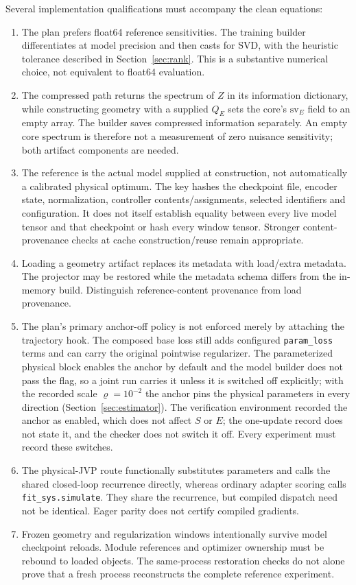 \documentclass[11pt,a4paper]{article}
\newcommand{\code}[1]{\nolinkurl{#1}}
\theoremstyle{remark}
\begin{document}
Several implementation qualifications must accompany the clean equations:
\begin{enumerate}
\item The plan prefers float64 reference sensitivities. The training builder differentiates at model precision and then casts for SVD, with the heuristic tolerance described in Section~\ref{sec:rank}. This is a substantive numerical choice, not equivalent to float64 evaluation.
\item The compressed path returns the spectrum of $Z$ in its information dictionary, while constructing geometry with a supplied $Q_E$ sets the core's $\mathrm{sv}_E$ field to an empty array. The builder saves compressed information separately. An empty core spectrum is therefore not a measurement of zero nuisance sensitivity; both artifact components are needed.
\item The reference is the actual model supplied at construction, not automatically a calibrated physical optimum. The key hashes the checkpoint file, encoder state, normalization, controller contents/assignments, selected identifiers and configuration. It does not itself establish equality between every live model tensor and that checkpoint or hash every window tensor. Stronger content-provenance checks at cache construction/reuse remain appropriate.
\item Loading a geometry artifact replaces its metadata with load/extra metadata. The projector may be restored while the metadata schema differs from the in-memory build. Distinguish reference-content provenance from load provenance.
\item The plan's primary anchor-off policy is not enforced merely by attaching the trajectory hook. The composed base loss still adds configured \code{param_loss} terms and can carry the original pointwise regularizer. The parameterized physical block enables the anchor by default and the model builder does not pass the flag, so a joint run carries it unless it is switched off explicitly; with the recorded scale $\varrho=10^{-2}$ the anchor pins the physical parameters in every direction (Section~\ref{sec:estimator}). The verification environment recorded the anchor as enabled, which does not affect $S$ or $E$; the one-update record does not state it, and the checker does not switch it off. Every experiment must record these switches.
\item The physical-JVP route functionally substitutes parameters and calls the shared closed-loop recurrence directly, whereas ordinary adapter scoring calls \code{fit_sys.simulate}. They share the recurrence, but compiled dispatch need not be identical. Eager parity does not certify compiled gradients.
\item Frozen geometry and regularization windows intentionally survive model checkpoint reloads. Module references and optimizer ownership must be rebound to loaded objects. The same-process restoration checks do not alone prove that a fresh process reconstructs the complete reference experiment.
\end{enumerate}
\end{document}

